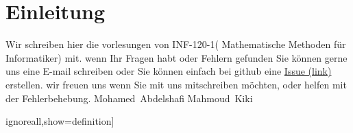 \documentclass[a4paper,12pt]{report}
\newcommand{\nameE}{Abdelshafi}
\newcommand{\vornameE}{Mohamed}
\newcommand{\nameS}{Kiki}
\newcommand{\vornameS}{Mahmoud}
\theoremstyle{plain} %
\theoremstyle{break}
\begin{document}
    \chapter*{Einleitung}
    Wir schreiben hier die vorlesungen von INF-120-1( Mathematische Methoden für Informatiker) mit.
    wenn Ihr Fragen habt oder Fehlern gefunden Sie können gerne uns eine E-mail schreiben oder Sie können einfach bei github eine  \href{https://github.com/CU1KNIGHT/inf120/issues}{Issue (link)} erstellen.
    wir freuen uns wenn Sie mit uns mitschreiben möchten, oder helfen mit der Fehlerbehebung.
    \newline \newline
    \vornameE \ \nameE \newline
    \vornameS  \ \nameS
    
    
%
%
%
%
%
%

\listoftheorems[]ignoreall,show={definition}]
\listoftheorems[ignoreall,show={example}]
\end{document}
